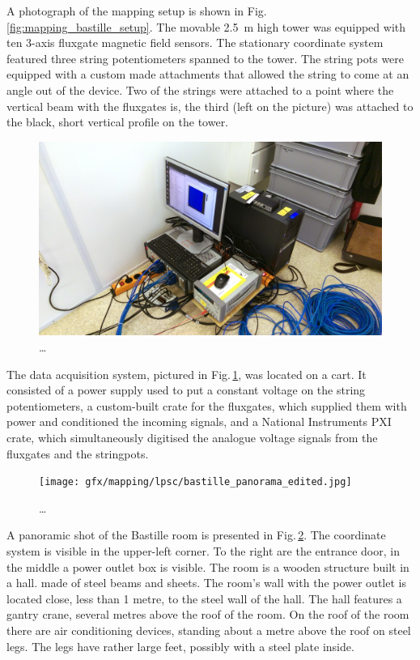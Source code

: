 A photograph of the mapping setup is shown in Fig.\,\ref{fig:mapping_bastille_setup}. The movable \SI{2.5}{\meter} high tower was equipped with ten 3-axis fluxgate magnetic field sensors. The stationary coordinate system featured three string potentiometers spanned to the tower. The string pots were equipped with a custom made attachments that allowed the string to come at an angle out of the device. Two of the strings were attached to a point where the vertical beam with the fluxgates is, the third (left on the picture) was attached to the black, short vertical profile on the tower.


\begin{figure}
  \centering
  \includegraphics[width=0.9\linewidth]{gfx/mapping/lpsc/daq_edited.jpg}
  \caption{\ldots}
  \label{fig:mapping_bastille_daq}
\end{figure}

The data acquisition system, pictured in Fig.\,\ref{fig:mapping_bastille_daq}, was located on a cart. It consisted of a power supply used to put a constant voltage on the string potentiometers, a custom-built crate for the fluxgates, which supplied them with power and conditioned the incoming signals, and a National Instruments PXI crate, which simultaneously digitised the analogue voltage signals from the fluxgates and the stringpots.

\begin{figure}
  \centering
  \texttt{[image: gfx/mapping/lpsc/bastille\_panorama\_edited.jpg]}
  \caption{\ldots}
  \label{fig:mapping_bastille_panorama}
\end{figure}

A panoramic shot of the Bastille room is presented in Fig.\,\ref{fig:mapping_bastille_panorama}. The coordinate system is visible in the upper-left corner. To the right are the entrance door, in the middle a power outlet box is visible.
The room is a wooden structure built in a hall. made of steel beams and sheets. The room's wall with the power outlet is located close, less than 1 metre, to the steel wall of the hall. The hall features a gantry crane, several metres above the roof of the room. On the roof of the room there are air conditioning devices, standing about a metre above the roof on steel legs. The legs have rather large feet, possibly with a steel plate inside.

